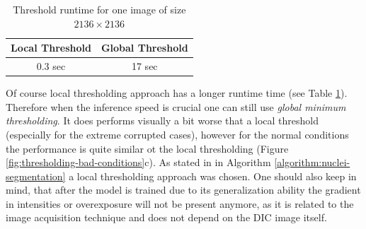 \begin{table}[htb]
  \centering
      \begin{tabular}{||c c||} 
       \hline
       Local Threshold & Global Threshold \\ [0.5ex] 
       \hline\hline
       0.3 sec & 17 sec  \\ 
       \hline
      \end{tabular}
      \caption{Threshold runtime for one image of size $2136 \times 2136$}
      \label{table:threshold-timing}
  \end{table}
  
Of course local thresholding approach has a longer runtime time (see Table \ref{table:threshold-timing}). Therefore when the inference speed is crucial one can still use \textit{global minimum thresholding}. It does performs visually a bit worse that a local threshold (especially for the extreme corrupted cases), however for the normal conditions the performance is quite similar ot the local thresholding (Figure \ref{fig:thresholding-bad-conditions}c). As stated in in Algorithm \ref{algorithm:nuclei-segmentation} a local thresholding approach was chosen. One should also keep in mind, that after the model is trained due to its generalization ability the gradient in intensities or overexposure will not be present anymore, as it is related to the image acquisition technique and does not depend on the DIC image itself.


